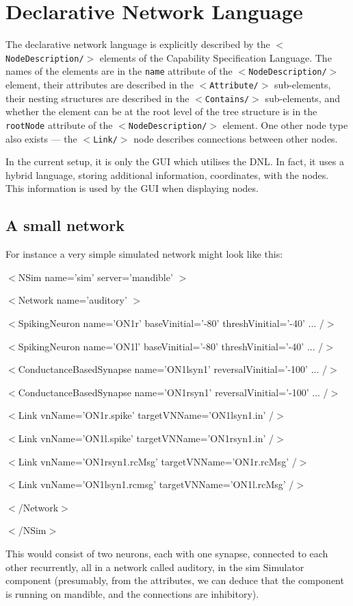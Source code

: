 \documentclass[pdftex,a4paper]{article}
\newcommand{\XML}[2][]{{\tt \small $<$#2#1/$>$}}
\newcommand{\XMLfont}[1]{{\tt \small #1}}
\newcommand{\XMLtext}[1]{
  \begin{tt}
    \begin{small}
      \begin{list}{}{
          \setlength{\topsep}{0pt}
          \setlength{\partopsep}{0pt}
          \setlength{\itemsep}{0pt}
          \setlength{\parsep}{0pt}
          \setlength{\leftmargin}{2em}
          \setlength{\rightmargin}{2em}
          \setlength{\labelsep}{0pt}
        }
      \item #1
      \end{list}
    \end{small}
  \end{tt}
}
\newcommand{\XMLfull}[3][]{\XMLtext{$<$#2#1$>$
    #3
  \item $<$/#2$>$}}
\newcommand{\XMLsimple}[2][]{\XMLtext{$<$#2#1/$>$}}
\begin{document}
\section{Declarative Network Language}

The declarative network language is explicitly described by the
\XML{NodeDescription} elements of the Capability Specification
Language. The names of the elements are in the \XMLfont{name}
attribute of the \XML{NodeDescription} element, their attributes are
described in the \XML{Attribute} sub-elements, their nesting
structures are described in the \XML{Contains} sub-elements, and
whether the element can be at the root level of the tree structure is
in the \XMLfont{rootNode} attribute of the \XML{NodeDescription}
element. One other node type also exists --- the \XML{Link} node
describes connections between other nodes.

In the current setup, it is only the GUI which utilises the DNL. In fact, it
uses a hybrid language, storing additional information, coordinates, with the nodes. This
information is used by the GUI when displaying nodes.

\subsection{A small network}

For instance a very simple simulated network might look like this:

\XMLfull[ name='sim' server='mandible' ]{NSim}{
  \XMLfull[ name='auditory' ]{Network}{
    \XMLsimple[ name='ON1r' baseVinitial='-80' threshVinitial='-40'
      ... ]{SpikingNeuron}
    \XMLsimple[ name='ON1l' baseVinitial='-80' threshVinitial='-40'
      ... ]{SpikingNeuron}
    \XMLsimple[ name='ON1lsyn1' reversalVinitial='-100'
  ... ]{ConductanceBasedSynapse}
    \XMLsimple[ name='ON1rsyn1' reversalVinitial='-100'
  ... ]{ConductanceBasedSynapse}
    \XMLsimple[ vnName='ON1r.spike'
    targetVNName='ON1lsyn1.in' ]{Link}
    \XMLsimple[ vnName='ON1l.spike'
    targetVNName='ON1rsyn1.in' ]{Link}
    \XMLsimple[ vnName='ON1rsyn1.rcMsg'
    targetVNName='ON1r.rcMsg' ]{Link}
    \XMLsimple[ vnName='ON1lsyn1.rcmsg'
  targetVNName='ON1l.rcMsg' ]{Link} } }

This would consist of two neurons, each with one synapse, connected to
each other recurrently, all in a network called auditory, in the sim
Simulator component (presumably, from the attributes, we can deduce
that the component is running on mandible, and the connections are
inhibitory).
\end{document}
